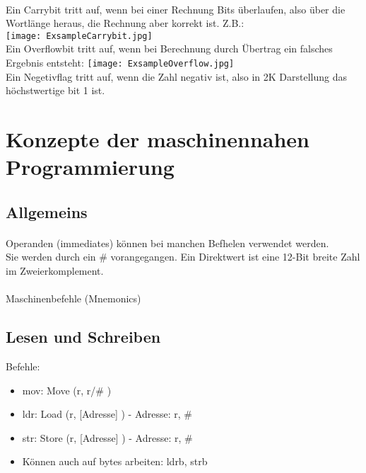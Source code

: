 		\paragraph{} Ein Carrybit tritt auf, wenn bei einer Rechnung
		Bits überlaufen, also über die Wortlänge heraus, die Rechnung aber 
		korrekt ist. Z.B.: \\ \texttt{[image: ExsampleCarrybit.jpg]} \\

		Ein Overflowbit tritt auf, wenn bei Berechnung durch Übertrag ein falsches
		Ergebnis entsteht: \texttt{[image: ExsampleOverflow.jpg]} \\

		Ein Negetivflag tritt auf, wenn die Zahl negativ ist, also in 2K Darstellung
		das höchstwertige bit 1 ist.



\newpage
\section{Konzepte der maschinennahen Programmierung}
	\subsection{Allgemeins}
		\paragraph{} Operanden (immediates) können bei manchen Befhelen verwendet werden. \\
		Sie werden durch ein \# vorangegangen. Ein Direktwert ist eine 12-Bit breite 
		Zahl im Zweierkomplement.
		\paragraph{} Maschinenbefehle (Mnemonics)

	\subsection{Lesen und Schreiben}
		Befehle:
		\begin{itemize}
			\item mov: Move  (r, r/\# )
			\item ldr: Load  (r, [Adresse] ) - Adresse: r, \#
			\item str: Store (r, [Adresse] ) - Adresse: r, \#
			\item Können auch auf bytes arbeiten: ldrb, strb
		\end{itemize}
		\vspace{0.5cm}

